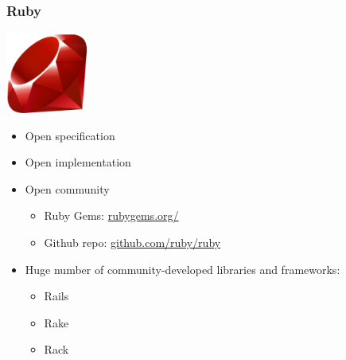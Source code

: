\documentclass{beamer}
\begin{document}
\begin{frame}
  \frametitle{Ruby}
  \begin{center} 
    \includegraphics[width=0.2\textwidth]{../img/ruby}

    \begin{itemize}
    \item Open specification
    \item Open implementation
    \item Open community
      \begin{itemize}
      \item Ruby Gems: \href{http://rubygems.org/}{rubygems.org/}
      \item Github repo: \href{https://github.com/ruby/ruby}{github.com/ruby/ruby}
      \end{itemize}
    \item Huge number of community-developed libraries and frameworks:
      \begin{itemize}
      \item Rails
      \item Rake
      \item Rack
      \end{itemize}
    \end{itemize}
  \end{center}
\end{frame}


\end{document}
